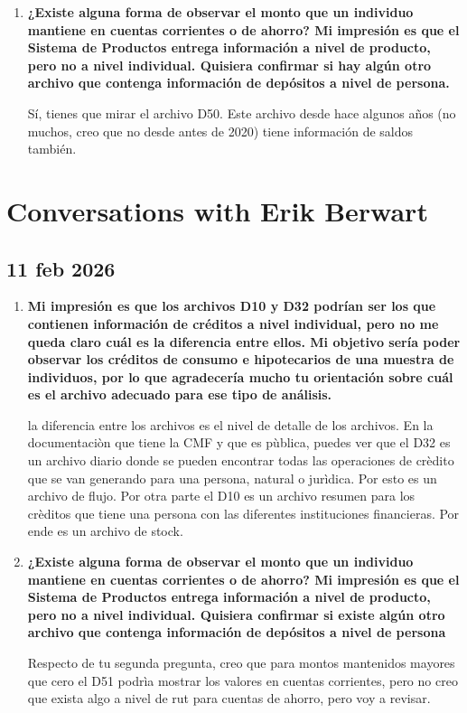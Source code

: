 \documentclass[12pt]{article}
\theoremstyle{plain}
\theoremstyle{plain}
\theoremstyle{definition}  %
\theoremstyle{remark}  %
\begin{document}
\begin{enumerate}

Importante: Dado lo anterior hay dos formas de calcular “pagos”. Una es mediante diferenciales de stocks de deuda, y la otra es calcular “planes de pagos” mediante el D32. Depende un poco del objetivo que estes buscando cual alternativa es mejor, pero al menos hay dos formas.

\item \textbf{¿Existe alguna forma de observar el monto que un individuo mantiene en cuentas corrientes o de ahorro? Mi impresión es que el Sistema de Productos entrega información a nivel de producto, pero no a nivel individual. Quisiera confirmar si hay algún otro archivo que contenga información de depósitos a nivel de persona.}

Sí, tienes que mirar el archivo D50. Este archivo desde hace algunos años (no muchos, creo que no desde antes de 2020) tiene información de saldos también.


\end{enumerate}

\section{Conversations with Erik Berwart}
\subsection{11 feb 2026}
\begin{enumerate}
    \item \textbf{Mi impresión es que los archivos D10 y D32 podrían ser los que contienen información de créditos a nivel individual, pero no me queda claro cuál es la diferencia entre ellos. Mi objetivo sería poder observar los créditos de consumo e hipotecarios de una muestra de individuos, por lo que agradecería mucho tu orientación sobre cuál es el archivo adecuado para ese tipo de análisis.}

la diferencia entre los archivos es el nivel de detalle de los archivos.
En la documentaciòn que tiene la CMF y que es pùblica, puedes ver que el D32 es un archivo diario donde se pueden encontrar todas las operaciones de crèdito que se van generando para una persona, natural o jurìdica. Por esto es un archivo de flujo.
Por otra parte el D10 es un archivo resumen para los crèditos que tiene una persona con las diferentes instituciones financieras. Por ende es un archivo de stock.

\item \textbf{¿Existe alguna forma de observar el monto que un individuo mantiene en cuentas corrientes o de ahorro? Mi impresión es que el Sistema de Productos entrega información a nivel de producto, pero no a nivel individual. Quisiera confirmar si existe algún otro archivo que contenga información de depósitos a nivel de persona}


Respecto de tu segunda pregunta, creo que para montos mantenidos mayores que cero el D51 podrìa mostrar los valores en cuentas corrientes, pero no creo que exista algo a nivel de rut para cuentas de ahorro, pero voy a revisar.

\end{enumerate}
\end{document}
